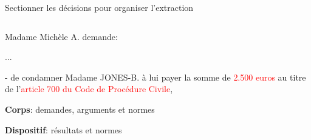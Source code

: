 \documentclass[newPxFont,pagenumber]{beamer}
\begin{document}
\begin{frame}{Sectionner les décisions pour organiser l'extraction}
\begin{columns}
\begin{column}{.55\linewidth}
{\begin{minipage}{\textwidth}
Madame Michèle A. demande:

...

- de condamner Madame JONES-B. à lui payer la somme de \textcolor{red}{2.500 euros} au titre de l'\textcolor{red}{article 700 du Code de Procédure Civile}, 
\end{minipage}}
\vspace{0.1cm}

{\normalsize \textbf{Corps}: demandes, arguments et normes }

\vspace{0.4cm}

\vspace{0.1cm}

{\normalsize \textbf{Dispositif}: résultats et normes}

\end{column}
\end{columns}
\end{frame}
\end{document}
